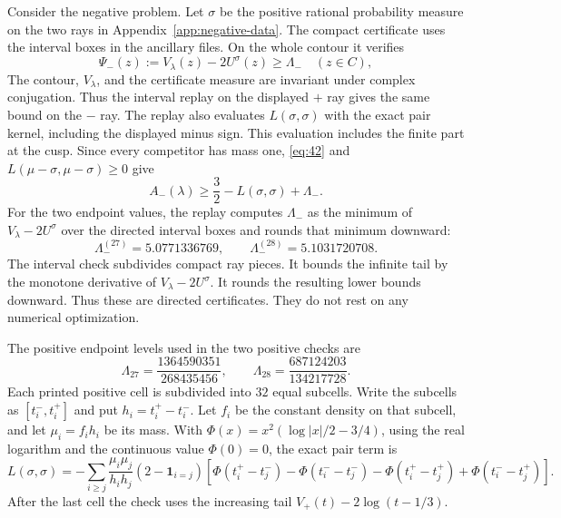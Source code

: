 Consider the negative problem. Let $\sigma$ be the positive rational
probability measure on the two rays in Appendix~\ref{app:negative-data}. The compact
certificate uses the
interval boxes in the ancillary files. On the whole contour it verifies
\begin{equation}
\Psi_-(z):=V_\lambda(z)-2U^\sigma(z)\ge\Lambda_-
 \quad(z\in C),                                          \label{eq:42}
\end{equation}
The contour, $V_\lambda$, and the certificate measure are invariant under
complex conjugation. Thus the interval replay on the displayed $+$ ray gives
the same bound on the $-$ ray. The replay also evaluates
$L(\sigma,\sigma)$ with the exact pair kernel, including the displayed
minus sign. This
evaluation includes the finite part at the cusp. Since every competitor
has mass one, \eqref{eq:42} and
$L(\mu-\sigma,\mu-\sigma)\ge0$ give
\begin{equation}
 A_-(\lambda)\ge\frac32-L(\sigma,\sigma)+\Lambda_- .     \label{eq:43}
\end{equation}
For the two endpoint values, the replay computes $\Lambda_-$ as the minimum
of $V_\lambda-2U^\sigma$ over the directed interval boxes and rounds that
minimum downward:
\begin{equation}
 \Lambda_-^{(27)}=5.0771336769,\qquad
 \Lambda_-^{(28)}=5.1031720708.                            \label{eq:lambda-minus}
\end{equation}
The interval check subdivides compact ray pieces. It bounds the infinite
tail by the monotone derivative of $V_\lambda-2U^\sigma$. It rounds the
resulting lower bounds downward. Thus these are directed certificates.
They do not rest on any numerical optimization.

The positive endpoint levels used in the two positive checks are
\[
 \Lambda_{27}=\frac{1364590351}{268435456},\qquad
 \Lambda_{28}=\frac{687124203}{134217728}.
\]
Each printed positive cell is subdivided into $32$ equal subcells. Write the
subcells as $[t_i^-,t_i^+]$ and put $h_i=t_i^+-t_i^-$. Let $f_i$ be the
constant density on that subcell, and let $\mu_i=f_i h_i$ be its mass. With
$\Phi(x)=x^2(\log|x|/2-3/4)$, using the real logarithm and the continuous
value $\Phi(0)=0$, the exact pair term is
\[
 L(\sigma,\sigma)=-\sum_{i\ge j}\frac{\mu_i\mu_j}{h_i h_j}
 (2-\mathbf1_{i=j})
 [\Phi(t_i^+-t_j^-)-\Phi(t_i^--t_j^-)-\Phi(t_i^+-t_j^+)+\Phi(t_i^--t_j^+)].
\]
After the last cell the check uses the increasing tail
$V_+(t)-2\log(t-1/3)$.

